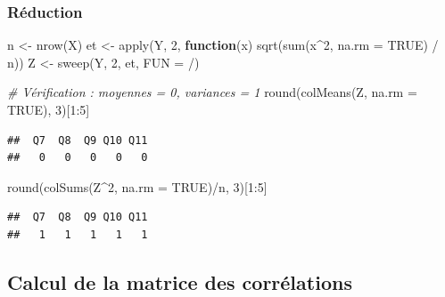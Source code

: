 \documentclass[
]{article}
\newenvironment{Shaded}{\begin{snugshade}}{\end{snugshade}}
\newcommand{\AttributeTok}[1]{\textcolor[rgb]{0.77,0.63,0.00}{#1}}
\newcommand{\CommentTok}[1]{\textcolor[rgb]{0.56,0.35,0.01}{\textit{#1}}}
\newcommand{\ConstantTok}[1]{\textcolor[rgb]{0.00,0.00,0.00}{#1}}
\newcommand{\ControlFlowTok}[1]{\textcolor[rgb]{0.13,0.29,0.53}{\textbf{#1}}}
\newcommand{\DecValTok}[1]{\textcolor[rgb]{0.00,0.00,0.81}{#1}}
\newcommand{\FunctionTok}[1]{\textcolor[rgb]{0.00,0.00,0.00}{#1}}
\newcommand{\NormalTok}[1]{#1}
\newcommand{\OtherTok}[1]{\textcolor[rgb]{0.56,0.35,0.01}{#1}}
\newcommand{\SpecialCharTok}[1]{\textcolor[rgb]{0.00,0.00,0.00}{#1}}
\newcommand{\StringTok}[1]{\textcolor[rgb]{0.31,0.60,0.02}{#1}}
\begin{document}
\hypertarget{ruxe9duction}{%
\subsubsection{Réduction}\label{ruxe9duction}}

\begin{Shaded}
\begin{Highlighting}[]
\NormalTok{n }\OtherTok{\textless{}{-}} \FunctionTok{nrow}\NormalTok{(X)}
\NormalTok{et }\OtherTok{\textless{}{-}} \FunctionTok{apply}\NormalTok{(Y, }\DecValTok{2}\NormalTok{, }\ControlFlowTok{function}\NormalTok{(x) }\FunctionTok{sqrt}\NormalTok{(}\FunctionTok{sum}\NormalTok{(x}\SpecialCharTok{\^{}}\DecValTok{2}\NormalTok{, }\AttributeTok{na.rm =} \ConstantTok{TRUE}\NormalTok{) }\SpecialCharTok{/}\NormalTok{ n))}
\NormalTok{Z }\OtherTok{\textless{}{-}} \FunctionTok{sweep}\NormalTok{(Y, }\DecValTok{2}\NormalTok{, et, }\AttributeTok{FUN =} \StringTok{\textquotesingle{}/\textquotesingle{}}\NormalTok{)}

\CommentTok{\# Vérification : moyennes = 0, variances = 1}
\FunctionTok{round}\NormalTok{(}\FunctionTok{colMeans}\NormalTok{(Z, }\AttributeTok{na.rm =} \ConstantTok{TRUE}\NormalTok{), }\DecValTok{3}\NormalTok{)[}\DecValTok{1}\SpecialCharTok{:}\DecValTok{5}\NormalTok{]}
\end{Highlighting}
\end{Shaded}

\begin{verbatim}
##  Q7  Q8  Q9 Q10 Q11 
##   0   0   0   0   0
\end{verbatim}

\begin{Shaded}
\begin{Highlighting}[]
\FunctionTok{round}\NormalTok{(}\FunctionTok{colSums}\NormalTok{(Z}\SpecialCharTok{\^{}}\DecValTok{2}\NormalTok{, }\AttributeTok{na.rm =} \ConstantTok{TRUE}\NormalTok{)}\SpecialCharTok{/}\NormalTok{n, }\DecValTok{3}\NormalTok{)[}\DecValTok{1}\SpecialCharTok{:}\DecValTok{5}\NormalTok{]}
\end{Highlighting}
\end{Shaded}

\begin{verbatim}
##  Q7  Q8  Q9 Q10 Q11 
##   1   1   1   1   1
\end{verbatim}

\hypertarget{calcul-de-la-matrice-des-corruxe9lations}{%
\subsection{Calcul de la matrice des
corrélations}\label{calcul-de-la-matrice-des-corruxe9lations}}
\end{document}
